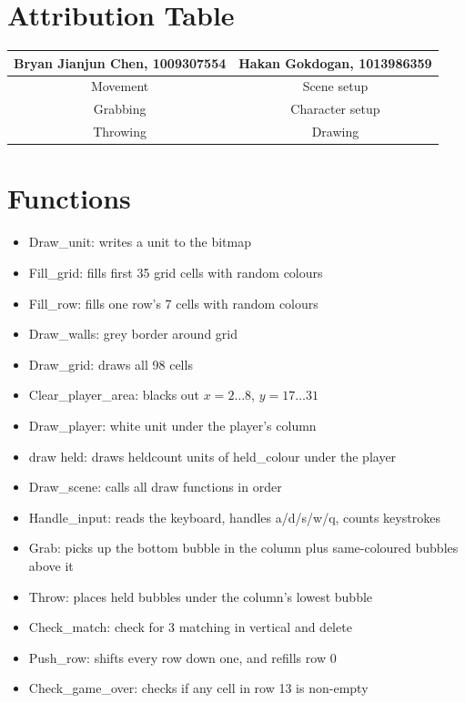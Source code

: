\documentclass{article}
\begin{document}
\section{Attribution Table}

\begin{center}
\begin{tabular}{|| c | c ||}
\hline
 Bryan Jianjun Chen, 1009307554 & Hakan Gokdogan, 1013986359 \\ 
 \hline
 Movement & Scene setup \\
 \hline
 Grabbing & Character setup \\
 \hline
 Throwing & Drawing \\ 
 \hline
\end{tabular}
\end{center}

\section{Functions}
\begin{itemize}
\item Draw\_unit: writes a unit to the bitmap
\item Fill\_grid: fills first 35 grid cells with random colours
\item Fill\_row: fills one row’s 7 cells with random colours
\item Draw\_walls: grey border around grid
\item Draw\_grid: draws all 98 cells
\item Clear\_player\_area: blacks out $x = 2\ldots8$, $y = 17\ldots31$
\item Draw\_player: white unit under the player’s column
\item draw held: draws heldcount units of held\_colour under the player
\item Draw\_scene: calls all draw functions in order
\item Handle\_input: reads the keyboard, handles a/d/s/w/q, counts keystrokes
\item Grab: picks up the bottom bubble in the column plus same-coloured bubbles above it
\item Throw: places held bubbles under the column’s lowest bubble
\item Check\_match: check for 3 matching in vertical and delete
\item Push\_row: shifts every row down one, and refills row 0
\item Check\_game\_over: checks if any cell in row 13 is non-empty
\end{itemize}
\end{document}

